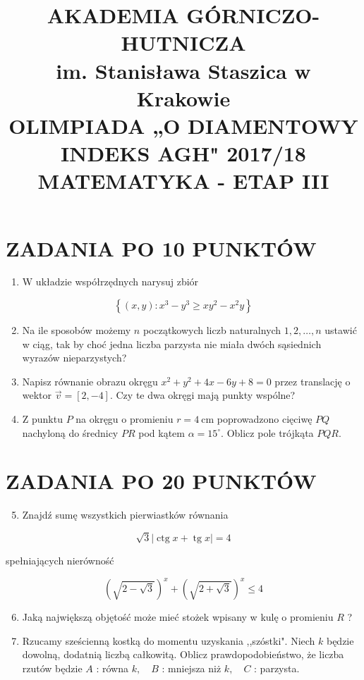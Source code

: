 \documentclass[10pt]{article}
\title{AKADEMIA GÓRNICZO-HUTNICZA \\
 im. Stanisława Staszica w Krakowie \\
 OLIMPIADA „O DIAMENTOWY INDEKS AGH" 2017/18 \\
 MATEMATYKA - ETAP III }
\author{}
\date{}
\begin{document}
\maketitle
\section*{ZADANIA PO 10 PUNKTÓW}
\begin{enumerate}
  \item W układzie współrzędnych narysuj zbiór
\end{enumerate}

$$
\left\{(x, y): x^{3}-y^{3} \geqslant x y^{2}-x^{2} y\right\}
$$

\begin{enumerate}
  \setcounter{enumi}{1}
  \item Na ile sposobów możemy $n$ początkowych liczb naturalnych $1,2, \ldots, n$ ustawić w ciąg, tak by choć jedna liczba parzysta nie miała dwóch sąsiednich wyrazów nieparzystych?
  \item Napisz równanie obrazu okręgu $x^{2}+y^{2}+4 x-6 y+8=0$ przez translację o wektor $\vec{v}=[2,-4]$. Czy te dwa okręgi mają punkty wspólne?
  \item Z punktu $P$ na okręgu o promieniu $r=4 \mathrm{~cm}$ poprowadzono cięciwę $P Q$ nachyloną do średnicy $P R$ pod kątem $\alpha=15^{\circ}$. Oblicz pole trójkąta $P Q R$.
\end{enumerate}

\section*{ZADANIA PO 20 PUNKTÓW}
\begin{enumerate}
  \setcounter{enumi}{4}
  \item Znajdź sumę wszystkich pierwiastków równania
\end{enumerate}

$$
\sqrt{3}|\operatorname{ctg} x+\operatorname{tg} x|=4
$$

spełniających nierówność

$$
(\sqrt{2-\sqrt{3}})^{x}+(\sqrt{2+\sqrt{3}})^{x} \leqslant 4
$$

\begin{enumerate}
  \setcounter{enumi}{5}
  \item Jaką największą objętość może mieć stożek wpisany w kulę o promieniu $R$ ?
  \item Rzucamy sześcienną kostką do momentu uzyskania ,,szóstki". Niech $k$ będzie dowolną, dodatnią liczbą całkowitą. Oblicz prawdopodobieństwo, że liczba rzutów będzie $A$ : równa $k, \quad B$ : mniejsza niż $k, \quad C$ : parzysta.
\end{enumerate}
\end{document}
